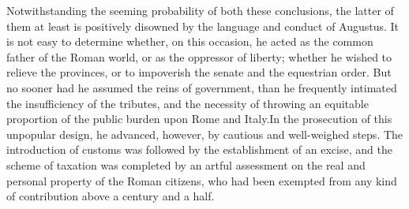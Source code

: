 Notwithstanding the seeming probability of both these
conclusions, the latter of them at least is positively disowned
by the language and conduct of Augustus. It is not easy to
determine whether, on this occasion, he acted as the common
father of the Roman world, or as the oppressor of liberty;
whether he wished to relieve the provinces, or to impoverish the
senate and the equestrian order. But no sooner had he assumed the
reins of government, than he frequently intimated the
insufficiency of the tributes, and the necessity of throwing an
equitable proportion of the public burden upon Rome and Italy.\footnotemark[961]
In the prosecution of this unpopular design, he advanced,
however, by cautious and well-weighed steps. The introduction of
customs was followed by the establishment of an excise, and the
scheme of taxation was completed by an artful assessment on the
real and personal property of the Roman citizens, who had been
exempted from any kind of contribution above a century and a
half.


